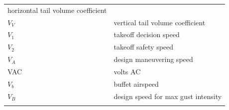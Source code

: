 \documentclass[
]{book}
\begin{document}
\begin{longtable}[]{@{}ll@{}}
\begin{minipage}[t]{0.47\columnwidth}
horizontal tail volume coefficient\strut
\end{minipage}\tabularnewline
\begin{minipage}[t]{0.47\columnwidth}\raggedright
\(V_V\)\strut
\end{minipage} & \begin{minipage}[t]{0.47\columnwidth}\raggedright
vertical tail volume coefficient\strut
\end{minipage}\tabularnewline
\begin{minipage}[t]{0.47\columnwidth}\raggedright
\(V_1\)\strut
\end{minipage} & \begin{minipage}[t]{0.47\columnwidth}\raggedright
takeoff decision speed\strut
\end{minipage}\tabularnewline
\begin{minipage}[t]{0.47\columnwidth}\raggedright
\(V_2\)\strut
\end{minipage} & \begin{minipage}[t]{0.47\columnwidth}\raggedright
takeoff safety speed\strut
\end{minipage}\tabularnewline
\begin{minipage}[t]{0.47\columnwidth}\raggedright
\(V_A\)\strut
\end{minipage} & \begin{minipage}[t]{0.47\columnwidth}\raggedright
design maneuvering speed\strut
\end{minipage}\tabularnewline
\begin{minipage}[t]{0.47\columnwidth}\raggedright
VAC\strut
\end{minipage} & \begin{minipage}[t]{0.47\columnwidth}\raggedright
volts AC\strut
\end{minipage}\tabularnewline
\begin{minipage}[t]{0.47\columnwidth}\raggedright
\(V_b\)\strut
\end{minipage} & \begin{minipage}[t]{0.47\columnwidth}\raggedright
buffet airspeed\strut
\end{minipage}\tabularnewline
\begin{minipage}[t]{0.47\columnwidth}\raggedright
\(V_B\)\strut
\end{minipage} & \begin{minipage}[t]{0.47\columnwidth}\raggedright
design speed for max gust intensity\strut
\end{minipage}\tabularnewline
\begin{minipage}[t]{0.47\columnwidth}\raggedright

\end{minipage}
\end{longtable}
\end{document}
